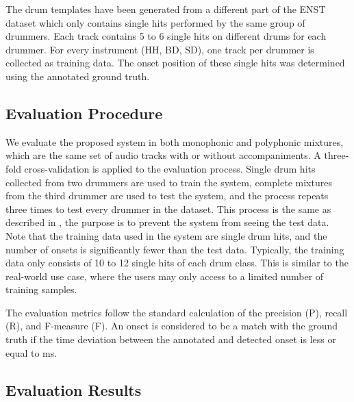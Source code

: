 \documentclass{article}
\begin{document}
The drum templates have been generated from a different part of the ENST dataset which only contains single hits performed by the same group of drummers. Each track contains 5 to 6 single hits on different drums for each drummer. For every instrument (HH, BD, SD), one track per drummer is collected as training data. The onset position of these single hits was determined using the annotated ground truth. 

\subsection{Evaluation Procedure}\label{subsec:evaluation procedure}
We evaluate the proposed system in both monophonic and polyphonic mixtures, which are the same set of audio tracks with or without accompaniments. A three-fold cross-validation is applied to the evaluation process. Single drum hits collected from two drummers are used to train the system, complete mixtures from the third drummer are used to test the system, and the process repeats three times to test every drummer in the dataset. This process is the same as described in \cite{Paulus2009a}, the purpose is to prevent the system from seeing the test data. Note that the training data used in the system are single drum hits, and the number of onsets is significantly fewer than the test data. Typically, the training data only consists of 10 to 12 single hits of each drum class. This is similar to the real-world use case, where the users may only access to a limited number of training samples. 

The evaluation metrics follow the standard calculation of the precision (P), recall (R), and F-measure (F). An onset is considered to be a match with the ground truth if the time deviation between the annotated and detected onset is less or equal to \unit[50]{ms}.  

\subsection{Evaluation Results}\label{subsec:evaluation results}
\end{document}
